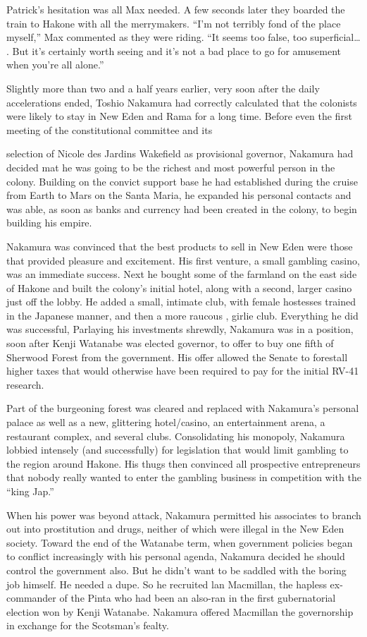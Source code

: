 \documentclass[]{article}
\begin{document}
{Patrick’s hesitation was all Max needed.  A few seconds later they boarded the train to Hakone with all the merrymakers.  “I’m not terribly fond of the place myself,” Max commented as they were riding.  “It seems too false, too superficial… .  But it’s certainly worth seeing and it’s not a bad place to go for amusement when you’re all alone.”

Slightly more than two and a half years earlier, very soon after the daily accelerations ended, Toshio Nakamura had correctly calculated that the colonists were likely to stay in New Eden and Rama for a long time.  Before even the first meeting of the constitutional committee and its

selection of Nicole des Jardins Wakefield as provisional governor, Nakamura had decided mat he was going to be the richest and most powerful person in the colony.  Building on the convict support base he had established during the cruise from Earth to Mars on the Santa Maria, he expanded his personal contacts and was able, as soon as banks and currency had been created in the colony, to begin building his empire.

Nakamura was convinced that the best products to sell in New Eden were those that provided pleasure and excitement.  His first venture, a small gambling casino, was an immediate success.  Next he bought some of the farmland on the east side of Hakone and built the colony’s initial hotel, along with a second, larger casino just off the lobby.  He added a small, intimate club, with female hostesses trained in the Japanese manner, and then a more raucous , girlie club.  Everything he did was successful, Parlaying his investments shrewdly, Nakamura was in a position, soon after Kenji Watanabe was elected governor, to offer to buy one fifth of Sherwood Forest from the government.  His offer allowed the Senate to forestall higher taxes that would otherwise have been required to pay for the initial RV-41 research.

Part of the burgeoning forest was cleared and replaced with Nakamura’s personal palace as well as a new, glittering hotel/casino, an entertainment arena, a restaurant complex, and several clubs.  Consolidating his monopoly, Nakamura lobbied intensely (and successfully) for legislation that would limit gambling to the region around Hakone.  His thugs then convinced all prospective entrepreneurs that nobody really wanted to enter the gambling business in competition with the “king Jap.”

When his power was beyond attack, Nakamura permitted his associates to branch out into prostitution and drugs, neither of which were illegal in the New Eden society.  Toward the end of the Watanabe term, when government policies began to conflict increasingly with his personal agenda, Nakamura decided he should control the government also.  But he didn’t want to be saddled with the boring job himself.  He needed a dupe.  So he recruited lan Macmillan, the hapless ex-commander of the Pinta who had been an also-ran in the first gubernatorial election won by Kenji Watanabe.  Nakamura offered Macmillan the governorship in exchange for the Scotsman’s fealty.

}
\end{document}

